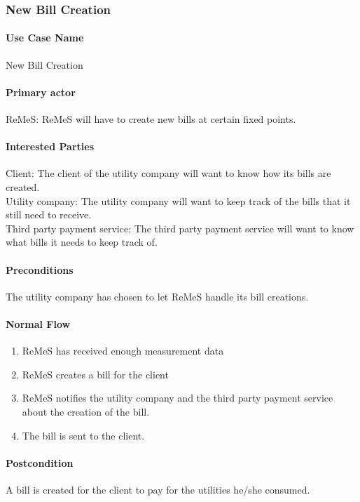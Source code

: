 \subsubsection{New Bill Creation}

\paragraph{Use Case Name}
New Bill Creation
\paragraph{Primary actor}
ReMeS: ReMeS will have to create new bills at certain fixed points.
\paragraph{Interested Parties}
Client: The client of the utility company will want to know how its bills are created. \\
Utility company: The utility company will want to keep track of the bills that it still need to receive. \\
Third party payment service: The third party payment service will want to know what bills it needs to keep track of.
\paragraph{Preconditions}
The utility company has chosen to let ReMeS handle its bill creations.
\paragraph{Normal Flow}
\begin{enumerate}
	\item ReMeS has received enough measurement data
	\item ReMeS creates a bill for the client
	\item ReMeS notifies the utility company and the third party payment service 
			about the creation of the bill.
	\item The bill is sent to the client.
\end{enumerate}


\paragraph{Postcondition}
A bill is created for the client to pay for the utilities he/she consumed.
